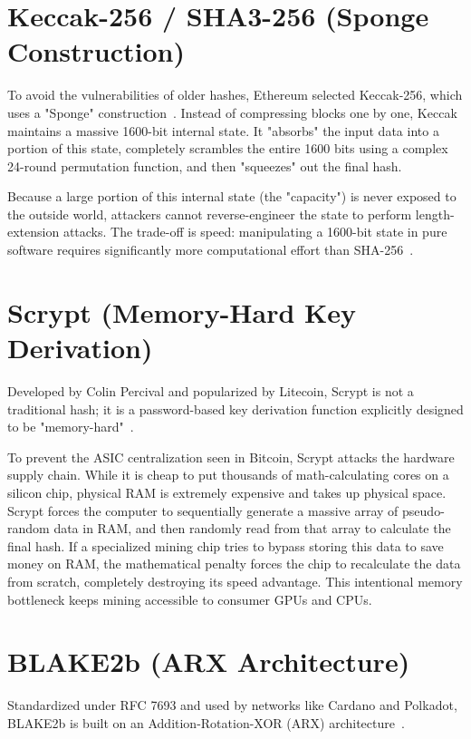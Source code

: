 \documentclass[11pt,a4paper,oneside]{book}
\begin{document}
\section{Keccak-256 / SHA3-256 (Sponge Construction)}
To avoid the vulnerabilities of older hashes, Ethereum selected Keccak-256, which uses a "Sponge" construction~\cite{wood2014ethereum, bertoni2013keccak}. Instead of compressing blocks one by one, Keccak maintains a massive 1600-bit internal state. It "absorbs" the input data into a portion of this state, completely scrambles the entire 1600 bits using a complex 24-round permutation function, and then "squeezes" out the final hash.

Because a large portion of this internal state (the "capacity") is never exposed to the outside world, attackers cannot reverse-engineer the state to perform length-extension attacks. The trade-off is speed: manipulating a 1600-bit state in pure software requires significantly more computational effort than SHA-256~\cite{paar2024understanding}.

\section{Scrypt (Memory-Hard Key Derivation)}
Developed by Colin Percival and popularized by Litecoin, Scrypt is not a traditional hash; it is a password-based key derivation function explicitly designed to be "memory-hard"~\cite{percival2009scrypt}.

To prevent the ASIC centralization seen in Bitcoin, Scrypt attacks the hardware supply chain. While it is cheap to put thousands of math-calculating cores on a silicon chip, physical RAM is extremely expensive and takes up physical space. Scrypt forces the computer to sequentially generate a massive array of pseudo-random data in RAM, and then randomly read from that array to calculate the final hash. If a specialized mining chip tries to bypass storing this data to save money on RAM, the mathematical penalty forces the chip to recalculate the data from scratch, completely destroying its speed advantage. This intentional memory bottleneck keeps mining accessible to consumer GPUs and CPUs.

\section{BLAKE2b (ARX Architecture)}
Standardized under RFC 7693 and used by networks like Cardano and Polkadot, BLAKE2b is built on an Addition-Rotation-XOR (ARX) architecture~\cite{aumasson2013blake2}.
\end{document}
